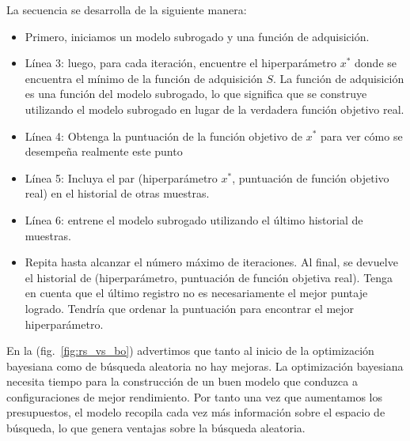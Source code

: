 \documentclass[a4paper,12pt]{article}
\begin{document}
La secuencia se desarrolla de la siguiente manera:
\begin{itemize}
	\item Primero, iniciamos un modelo subrogado y una función de adquisición.
	\item Línea 3: luego, para cada iteración, encuentre el hiperparámetro $x^*$ donde se encuentra el mínimo de la función de adquisición $S$. La función de adquisición es una función del modelo subrogado, lo que significa que se construye utilizando el modelo subrogado en lugar de la verdadera función objetivo real.
	\item Línea 4: Obtenga la puntuación de la función objetivo de $x^*$ para ver cómo se desempeña realmente este punto
	\item Línea 5: Incluya el par (hiperparámetro $x^*$, puntuación de función objetivo real) en el historial de otras muestras.
	\item Línea 6: entrene el modelo subrogado utilizando el último historial de muestras.
	\item Repita hasta alcanzar el número máximo de iteraciones. Al final, se devuelve el historial de (hiperparámetro, puntuación de función objetiva real). Tenga en cuenta que el último registro no es necesariamente el mejor puntaje logrado. Tendría que ordenar la puntuación para encontrar el mejor hiperparámetro.
\end{itemize}

En la (fig.~\ref{fig:rs_vs_bo}) \citep{automl-bohb} advertimos que tanto al inicio de la optimización bayesiana como de búsqueda aleatoria no hay mejoras. La optimización bayesiana necesita tiempo para la construcción de un buen modelo que conduzca a configuraciones de mejor rendimiento. Por tanto una vez que aumentamos los presupuestos, el modelo recopila cada vez más información sobre el espacio de búsqueda, lo que genera ventajas sobre la búsqueda aleatoria.

\end{document}
